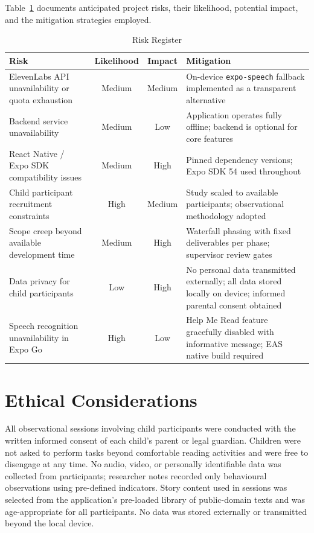 Table~\ref{tab:risks} documents anticipated project risks, their likelihood, potential impact, and the mitigation strategies employed.

\begin{table}[h!]
\centering
\caption{Risk Register}
\label{tab:risks}
\renewcommand{\arraystretch}{1.3}
\begin{tabularx}{\textwidth}{|X|c|c|X|}
\hline
\textbf{Risk} & \textbf{Likelihood} & \textbf{Impact} & \textbf{Mitigation} \\
\hline
ElevenLabs API unavailability or quota exhaustion & Medium & Medium & On-device \texttt{expo-speech} fallback implemented as a transparent alternative \\
Backend service unavailability & Medium & Low & Application operates fully offline; backend is optional for core features \\
React Native / Expo SDK compatibility issues & Medium & High & Pinned dependency versions; Expo SDK 54 used throughout \\
Child participant recruitment constraints & High & Medium & Study scaled to available participants; observational methodology adopted \\
Scope creep beyond available development time & Medium & High & Waterfall phasing with fixed deliverables per phase; supervisor review gates \\
Data privacy for child participants & Low & High & No personal data transmitted externally; all data stored locally on device; informed parental consent obtained \\
Speech recognition unavailability in Expo Go & High & Low & Help Me Read feature gracefully disabled with informative message; EAS native build required \\
\hline
\end{tabularx}
\end{table}

\section{Ethical Considerations}

All observational sessions involving child participants were conducted with the written informed consent of each child's parent or legal guardian. Children were not asked to perform tasks beyond comfortable reading activities and were free to disengage at any time. No audio, video, or personally identifiable data was collected from participants; researcher notes recorded only behavioural observations using pre-defined indicators. Story content used in sessions was selected from the application's pre-loaded library of public-domain texts and was age-appropriate for all participants. No data was stored externally or transmitted beyond the local device.
